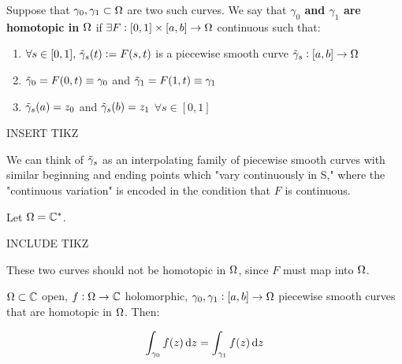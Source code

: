 \begin{definition}
Suppose that $\gamma_0, \gamma_1 \subset \Omega$ are two such curves. We say that \textbf{$\gamma_0$ and $\gamma_1$ are homotopic in $\Omega$} if $\exists F : [0,1] \times [a,b] \to \Omega$ continuous such that:

\begin{enumerate}
    \item $\forall s \in [0,1] , \, \Tilde{\gamma}_s(t) \vcentcolon = F(s,t)$ is a piecewise smooth curve $\Tilde{\gamma}_s : [a,b] \to \Omega$
    \item $\Tilde{\gamma}_0 = F(0,t) \equiv \gamma_0$ and $\Tilde{\gamma}_1 = F(1,t) \equiv \gamma_1$
    \item $\Tilde{\gamma}_s(a) = z_0$ and $\Tilde{\gamma}_s(b) = z_1$ $\forall s \in [0,1]$
\end{enumerate}

INSERT TIKZ

\end{definition}

We can think of $\Tilde{\gamma}_s$ as an interpolating family of piecewise smooth curves with similar beginning and ending points which "vary continuously in S," where the "continuous variation" is encoded in the condition that $F$ is continuous.


\begin{counterexample}
Let $\Omega = \mathbb{C}^*$.

INCLUDE TIKZ

These two curves should not be homotopic in $\Omega$, since $F$ must map into $\Omega$.
\end{counterexample}

\begin{proposition}

$\Omega \subset \mathbb{C}$ open, $f:\Omega \rightarrow \mathbb{C}$ holomorphic, $\gamma_0,\gamma_1:[a,b] \to \Omega$ piecewise smooth curves that are homotopic in $\Omega$. Then:

\begin{align*}
    \int_{\gamma_0} f(z) \dif z = \int_{\gamma_1} f(z) \dif z
\end{align*}

\end{proposition}

